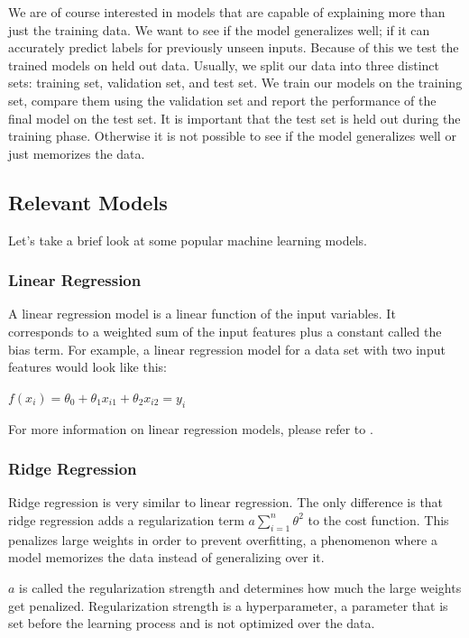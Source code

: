We are of course interested in models that are capable of explaining more than just the training data.
We want to see if the model generalizes well; if it can accurately predict labels for previously unseen inputs.
Because of this we test the trained models on held out data.
Usually, we split our data into three distinct sets: training set, validation set, and test set.
We train our models on the training set, compare them using the validation set and report the performance of the final model on the test set.
It is important that the test set is held out during the training phase.
Otherwise it is not possible to see if the model generalizes well or just memorizes the data.\parencite{ml:prml}

\subsection{Relevant Models}
Let's take a brief look at some popular machine learning models.
\subsubsection{Linear Regression}
A linear regression model is a linear function of the input variables.
It corresponds to a weighted sum of the input features plus a constant called the bias term.\parencite{homl:4}
For example, a linear regression model for a data set with two input features would look like this:

$f(x_i)=\theta_{0} + \theta_{1}x_{i1} + \theta_{2}x_{i2}=y_i$

For more information on linear regression models, please refer to \parencite{homl:4}.

\subsubsection{Ridge Regression}
Ridge regression is very similar to linear regression. 
The only difference is that ridge regression adds a regularization term $a\sum_{i=1}^{n}{\theta_{}^{2}}$ to the cost function. 
This penalizes large weights in order to prevent overfitting, a phenomenon where a model memorizes the data instead of generalizing over it.\parencite{homl:4}

$a$ is called the regularization strength and determines how much the large weights get penalized.
Regularization strength is a hyperparameter, a parameter that is set before the learning process and is not optimized over the data.\parencite{homl:4}

